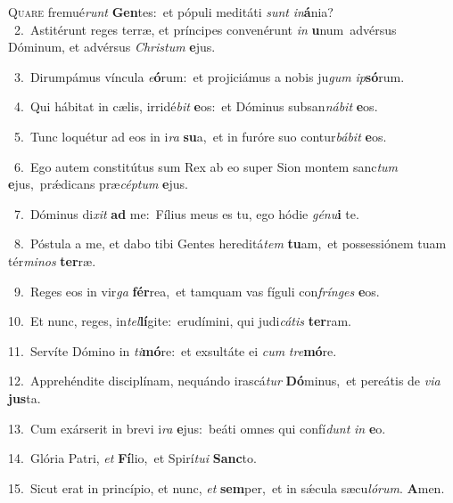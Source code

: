 \lettrine{\initial\textcolor{\initialcolor}{Q}}{uare} fremué\textit{runt} \textbf{Gen}\-tes:~\star et pópuli meditáti \textit{sunt} \textit{in}\-\textbf{á}nia?\\
{\numbfont\textcolor{\numbcolor}{~2.}}~Astitérunt reges terræ, et príncipes convenérunt \textit{in} \textbf{u}\-num~\star advérsus Dóminum, et advérsus \textit{Chris}\-\textit{tum} \textbf{e}\-jus.\par
{\numbfont\textcolor{\numbcolor}{~3.}}~Dirumpámus víncula \textit{e}\-\textbf{ó}rum:~\star et projiciámus a nobis ju\textit{gum} \textit{ip}\-\textbf{só}rum.\par
{\numbfont\textcolor{\numbcolor}{~4.}}~Qui hábitat in cælis, irridé\textit{bit} \textbf{e}\-os:~\star et Dóminus subsan\-\textit{ná}\-\textit{bit} \textbf{e}\-os.\par
{\numbfont\textcolor{\numbcolor}{~5.}}~Tunc loquétur ad eos in i\textit{ra} \textbf{su}\-a,~\star et in furóre suo contur\-\textit{bá}\-\textit{bit} \textbf{e}\-os.\par
{\numbfont\textcolor{\numbcolor}{~6.}}~Ego autem constitútus sum Rex ab eo super Sion montem sanc\textit{tum} \textbf{e}\-jus,~\star prǽdicans præ\-\textit{cép}\-\textit{tum} \textbf{e}\-jus.\par
{\numbfont\textcolor{\numbcolor}{~7.}}~Dóminus di\textit{xit} \textbf{ad} me:~\star Fílius meus es tu, ego hódie \textit{gé}\-\textit{nu}\textbf{i} te.\par
{\numbfont\textcolor{\numbcolor}{~8.}}~Póstula a me, et dabo tibi Gentes hereditá\textit{tem} \textbf{tu}\-am,~\star et possessiónem tuam tér\-\textit{mi}\-\textit{nos} \textbf{ter}\-ræ.\par
{\numbfont\textcolor{\numbcolor}{~9.}}~Reges eos in vir\textit{ga} \textbf{fér}\-rea,~\star et tamquam vas fíguli con\-\textit{frín}\-\textit{ges} \textbf{e}\-os.\par
{\numbfont\textcolor{\numbcolor}{10.}}~Et nunc, reges, in\-\textit{tel}\-\textbf{lí}gite:~\star erudímini, qui judi\-\textit{cá}\-\textit{tis} \textbf{ter}\-ram.\par
{\numbfont\textcolor{\numbcolor}{11.}}~Servíte Dómino in \textit{ti}\-\textbf{mó}re:~\star et exsultáte ei \textit{cum} \textit{tre}\-\textbf{mó}re.\par
{\numbfont\textcolor{\numbcolor}{12.}}~Apprehéndite disciplínam, nequándo irascá\textit{tur} \textbf{Dó}\-minus,~\star et pereátis de \textit{vi}\-\textit{a} \textbf{jus}\-ta.\par
{\numbfont\textcolor{\numbcolor}{13.}}~Cum exárserit in brevi i\textit{ra} \textbf{e}\-jus:~\star beáti omnes qui confí\textit{dunt} \textit{in} \textbf{e}\-o.\par
{\numbfont\textcolor{\numbcolor}{14.}}~Glória Patri, \textit{et} \textbf{Fí}\-lio,~\star et Spirí\-\textit{tu}\-\textit{i} \textbf{Sanc}\-to.\par
{\numbfont\textcolor{\numbcolor}{15.}}~Sicut erat in princípio, et nunc, \textit{et} \textbf{sem}\-per,~\star et in sǽcula sæcu\-\textit{ló}\-\textit{rum}. \textbf{A}\-men.\par
